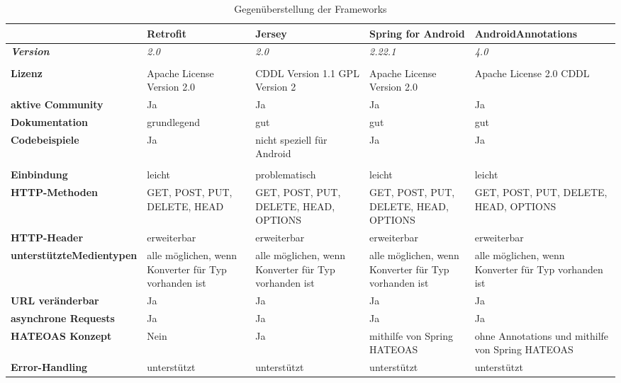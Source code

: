 \begin{landscape}
\renewcommand{\arraystretch}{1.3}
\begin{longtable}{m{3.5cm}|m{4.5cm}|m{4.5cm}|m{4.5cm}|m{4.5cm}}

      \caption{Gegenüberstellung der Frameworks} \\
	  \label{tableVergleich}	 
	  
	    & \textbf{Retrofit} & \textbf{Jersey} & \textbf{Spring for Android}  & \textbf{AndroidAnnotations}  \\ \hline
	    \textbf{\textit{Version}} & 
	    \textit{2.0} & \textit{2.0} & \textit{2.22.1} & \textit{4.0} \\ \hline \hhline{=====}
	   \multicolumn{5}{c}{\textbf{Entwicklungskultur}} \\ \hhline{=====}
	    
	  \textbf{Lizenz} &
	  Apache License Version 2.0 & CDDL Version 1.1 \newline GPL Version 2 & 
	  Apache License Version 2.0 & 
	  Apache License 2.0 \newline CDDL \\ \hline
	  \textbf{aktive Community} & Ja & Ja & Ja & Ja\\ \hline
	  \textbf{Dokumentation} & grundlegend & gut & gut  & gut \\ \hline 
		  \textbf{Codebeispiele} &  Ja  & nicht speziell für Android & Ja & Ja\\ \hhline{=====}
	  
	  \multicolumn{5}{c}{\textbf{Implementierung}} \\ \hhline{=====}
	  \textbf{Einbindung} & leicht & problematisch & leicht & leicht \\ \hline
	  \textbf{HTTP-Methoden} & GET, POST, PUT, DELETE, HEAD & GET, POST, PUT, DELETE, HEAD, OPTIONS  & GET, POST, PUT, DELETE, HEAD, OPTIONS & GET, POST, PUT, DELETE, HEAD, OPTIONS \\ \hline
	  \textbf{HTTP-Header} & erweiterbar & erweiterbar & erweiterbar & erweiterbar \\ \hline
	  \textbf{unterstützte\newline Medientypen} & alle möglichen, wenn Konverter für Typ vorhanden ist & alle möglichen, wenn Konverter für Typ vorhanden ist & alle möglichen, wenn Konverter für Typ vorhanden ist & alle möglichen, wenn Konverter für Typ vorhanden ist \\ \hline
	  \textbf{URL veränderbar} & Ja & Ja & Ja & Ja  \\ \hline
	  \textbf{asynchrone Requests} & Ja & Ja & Ja & Ja \\ \hline
	  \textbf{HATEOAS Konzept} & Nein & Ja & mithilfe von Spring HATEOAS & ohne Annotations und mithilfe von Spring HATEOAS \\ \hline 
	  \textbf{Error-Handling} & unterstützt & unterstützt & unterstützt & unterstützt \\ \hline
	

\end{longtable}
\end{landscape}
